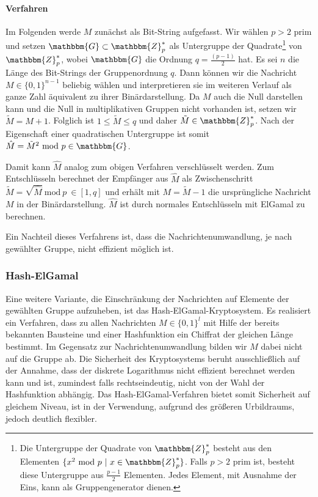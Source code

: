 \paragraph*{Verfahren} Im Folgenden werde $M$ zunächst als Bit-String
aufgefasst. Wir wählen $p > 2 $ prim und setzen $\mathbbm{G} \subset
\mathbbm{Z}^*_p$ als Untergruppe der Quadrate\footnote{Die Untergruppe
  der Quadrate von $\mathbbm{Z}^*_p$ besteht aus den Elementen $\{x^2
  \text{ mod } p\ \vert\ x \in \mathbbm{Z}^*_p\}$. Falls $p > 2$ prim ist,
  besteht diese Untergruppe aus $\frac{p - 1}{2}$ Elementen. Jedes
  Element, mit Ausnahme der Eins, kann als Gruppengenerator dienen.} von
$\mathbbm{Z}^*_p$, wobei $\mathbbm{G}$ die Ordnung $q = \frac{(p -
  1)}{2}$ hat.  Es sei $n$ die Länge des Bit-Strings der Gruppenordnung
$q$. Dann können wir die Nachricht $M \in \{0, 1\}^{n - 1}$ beliebig
wählen und interpretieren sie im weiteren Verlauf als ganze Zahl
äquivalent zu ihrer Binärdarstellung. Da $M$ auch die Null darstellen
kann und die Null in multiplikativen Gruppen nicht vorhanden ist, setzen
wir $\tilde{M} = M + 1$. Folglich ist $ 1 \leq \tilde{M} \leq q$ und
daher $\tilde{M} \in \mathbbm{Z}^*_p$. Nach der Eigenschaft einer
quadratischen Untergruppe ist somit $\hat{M} = \tilde{M}^2 \text{ mod }
p \in \mathbbm{G}$.

Damit kann $\hat{M}$ analog zum obigen Verfahren verschlüsselt
werden. Zum Entschlüsseln berechnet der Empfänger aus $\hat{M}$ als
Zwischenschritt $\tilde{M} = \sqrt{\hat{M}}\ \text{mod}\ p\ \in [1, q]$
und erhält mit $M = \tilde{M} - 1$ die ursprüngliche Nachricht $M$ in
der Binärdarstellung. $\hat{M}$ ist durch normales Entschlüsseln mit
ElGamal zu berechnen.

Ein Nachteil dieses Verfahrens ist, dass die Nachrichtenumwandlung, je
nach gewählter Gruppe, nicht effizient möglich ist.

\subsubsection{Hash-ElGamal} Eine weitere Variante, die Einschränkung
der Nachrichten auf Elemente der gewählten Gruppe aufzuheben, ist das
Hash-ElGamal-Kryptosystem\indexHashElGamal. Es realisiert ein Verfahren,
dass zu allen Nachrichten $M \in \{0, 1\}^l$ mit Hilfe der bereits
bekannten Bausteine und einer Hashfunktion ein Chiffrat der gleichen
Länge bestimmt. Im Gegensatz zur Nachrichtenumwandlung bilden wir $M$
dabei nicht auf die Gruppe ab. Die Sicherheit des Kryptosystems beruht
ausschließlich auf der Annahme, dass der diskrete Logarithmus nicht
effizient berechnet werden kann und ist, zumindest falls
rechtseindeutig, nicht von der Wahl der Hashfunktion abhängig. Das
Hash-ElGamal-Verfahren bietet somit Sicherheit auf gleichem Niveau, ist
in der Verwendung, aufgrund des größeren Urbildraums, jedoch deutlich
flexibler.


